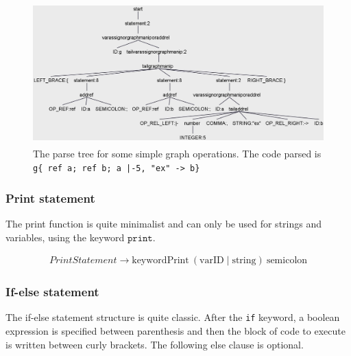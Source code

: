 \begin{figure}[H]
    \centering
    \includegraphics[height = 5.5cm]{figures/parse_trees/parseTree_graphManip}
    \caption{The parse tree for some simple graph operations. The code parsed is \texttt{g\{
        ref a;
        ref b;
        a |-5, "ex" -> b\} }}
    \label{fig:parseTree_graphManip}
\end{figure}

\subsubsection*{Print statement}

The print function is quite minimalist and can only be used for strings and variables, using the keyword $\texttt{print}$.

\begin{align*}
    \mathit{PrintStatement} \rightarrow \text{keywordPrint} \: (\text{varID} \mid \text{string}) \: \text{semicolon}
\end{align*}

\subsubsection*{If-else statement}

The if-else statement structure is quite classic.
After the \texttt{if} keyword, a boolean expression is specified between parenthesis and then the block of code to execute is written between curly brackets.
The following else clause is optional.

